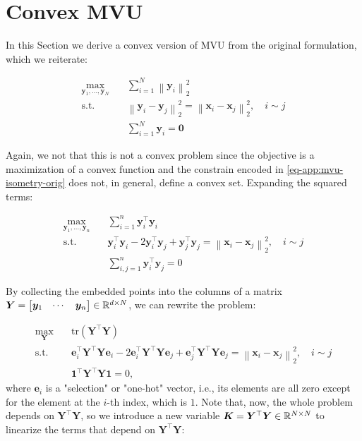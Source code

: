 \documentclass{article} %
\newcommand{\norm}[1]{\left\lVert#1\right\rVert}
\begin{document}
\section{Convex MVU}\label{app:convex-mvu}
In this Section we derive a convex version of MVU from the original formulation, which we reiterate:

\begin{align}
\max_{\bm{y}_{1},\dotsc,\bm{y}_{N}} \quad & \sum_{i=1}^{N}\norm{\bm{y}_{i}}_{2}^{2}\\
\textrm{s.t.} \quad & \norm{\bm{y}_{i}-\bm{y}_{j}}_{2}^{2}=\norm{\bm{x}_{i}-\bm{x}_{j}}_{2}^{2},\quad i\sim j\label{eq-app:mvu-isometry-orig}\\
\quad & \sum_{i=1}^{N}\bm{y}_{i}=\bm{0}\label{eq-app:mvu-zerocenter}
\end{align}

Again, we not that this is not a convex problem since the objective is a maximization of a convex function and the constrain encoded in \ref{eq-app:mvu-isometry-orig} does not, in general, define a convex set. Expanding the squared terms:

\begin{align}
\max_{\bm{y}_{1},\dotsc,\bm{y}_{n}} \quad & \sum_{i=1}^{n}\bm{y}_{i}^{\top}\bm{y}_{i}\\
\textrm{s.t.} \quad & \bm{y}_{i}^{\top}\bm{y}_{i} - 2 \bm{y}_{i}^{\top}\bm{y}_{j} + \bm{y}_{j}^{\top}\bm{y}_{j} =\norm{\bm{x}_{i}-\bm{x}_{j}}_{2}^{2},\quad i\sim j\\
\quad & \sum_{i,j=1}^{n}\bm{y}_{i}^{\top}\bm{y}_{j}=0
\end{align}

By collecting the embedded points into the columns of a matrix $\bm{Y}=\begin{bmatrix}\bm{y}_{1} & \cdots & \bm{y}_{n}\end{bmatrix}\in\mathbb{R}^{d\times N}$, we can rewrite the problem:

\begin{align}
\max_{\bm{Y}} \quad & \text{tr}(\bm{Y}^{\top}\bm{Y})\\
\textrm{s.t.} \quad & \bm{e}_{i}^{\top}\bm{Y}^{\top}\bm{Y}\bm{e}_{i} - 2 \bm{e}_{i}^{\top}\bm{Y}^{\top}\bm{Y}\bm{e}_{j} + \bm{e}_{j}^{\top}\bm{Y}^{\top}\bm{Y}\bm{e}_{j} =\norm{\bm{x}_{i}-\bm{x}_{j}}_{2}^{2},\quad i\sim j\\
\quad & \bm{1}^{\top}\bm{Y}^{\top}\bm{Y}\bm{1} = 0,
\end{align}
where $\bm{e}_i$ is a "selection" or "one-hot" vector, i.e., its elements are all zero except for the element at the $i$-th index, which is $1$. Note that, now, the whole problem depends on $\bm{Y}^\top\bm{Y}$, so we introduce a new variable $\bm{K}=\bm{Y}^{\top}\bm{Y}\in\mathbb{R}^{N\times N}$ to linearize the terms that depend on $\bm{Y}^\top\bm{Y}$:
\end{document}
